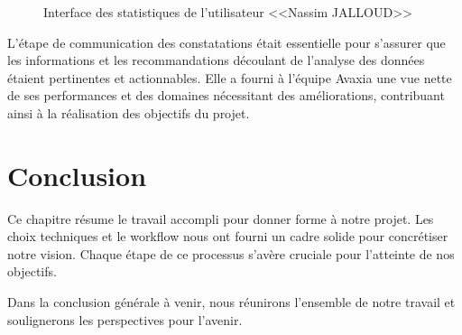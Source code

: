         \begin{figure}[H]

            \begin{minipage}{1\linewidth}
            \centering

            \caption{Interface des statistiques de l'utilisateur <<Nassim JALLOUD>>}
            \label{fig:cap2}
             \end{minipage}\hfill 
        \end{figure}
        \par L'étape de communication des constatations était essentielle pour s'assurer que les informations et les recommandations découlant de l'analyse des données étaient pertinentes et actionnables. Elle a fourni à l'équipe Avaxia une vue nette de ses performances et des domaines nécessitant des améliorations, contribuant ainsi à la réalisation des objectifs du projet.
        
\section*{Conclusion}
    Ce chapitre résume le travail accompli pour donner forme à notre projet. Les choix techniques et le workflow nous ont fourni un cadre solide pour concrétiser notre vision. Chaque étape de ce processus s'avère cruciale pour l'atteinte de nos objectifs.
    \par Dans la conclusion générale à venir, nous réunirons l'ensemble de notre travail et soulignerons les perspectives pour l'avenir.